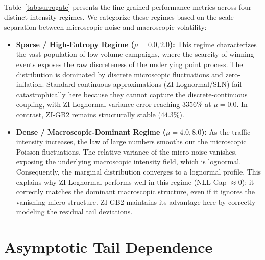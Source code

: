 \documentclass[sigconf, anonymous, review]{acmart}
\begin{document}
Table~\ref{tab:surrogate} presents the fine-grained performance metrics across four distinct intensity regimes. We categorize these regimes based on the scale separation between microscopic noise and macroscopic volatility:

\begin{itemize}
    \item \textbf{Sparse / High-Entropy Regime ($\mu=0.0, 2.0$):} This regime characterizes the vast population of low-volume campaigns, where the scarcity of winning events exposes the raw discreteness of the underlying point process. The distribution is dominated by discrete microscopic fluctuations and zero-inflation. Standard continuous approximations (ZI-Lognormal/SLN) fail catastrophically here because they cannot capture the discrete-continuous coupling, with ZI-Lognormal variance error reaching $3356\%$ at $\mu=0.0$. In contrast, ZI-GB2 remains structurally stable ($44.3\%$).
    
    \item \textbf{Dense / Macroscopic-Dominant Regime ($\mu=4.0, 8.0$):} As the traffic intensity increases, the law of large numbers smooths out the microscopic Poisson fluctuations. The relative variance of the micro-noise vanishes, exposing the underlying macroscopic intensity field, which is lognormal. Consequently, the marginal distribution converges to a lognormal profile. This explains why ZI-Lognormal performs well in this regime (NLL Gap $\approx 0$): it correctly matches the dominant macroscopic structure, even if it ignores the vanishing micro-structure. ZI-GB2 maintains its advantage here by correctly modeling the residual tail deviations.
\end{itemize}


\section{Asymptotic Tail Dependence}
\label{app:tail_dependence}

\taildep*
\end{document}
